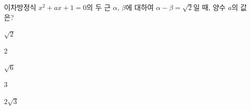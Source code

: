 이차방정식 $x^2+ax+1=0$의 두 근 $\alpha$, $\beta$에 대하여 $\alpha-\beta=\sqrt{2}$일 때, 양수 $a$의 값은?
\begin{choices32}{\rule[-3ex]{0pt}{8ex}$\sqrt{2}$}{\rule[-3ex]{0pt}{8ex}$2$}{\rule[-3ex]{0pt}{8ex}$\sqrt{6}$}{\rule[-3ex]{0pt}{8ex}$3$}{\rule[-3ex]{0pt}{8ex}$2\sqrt{3}$}\end{choices32}
